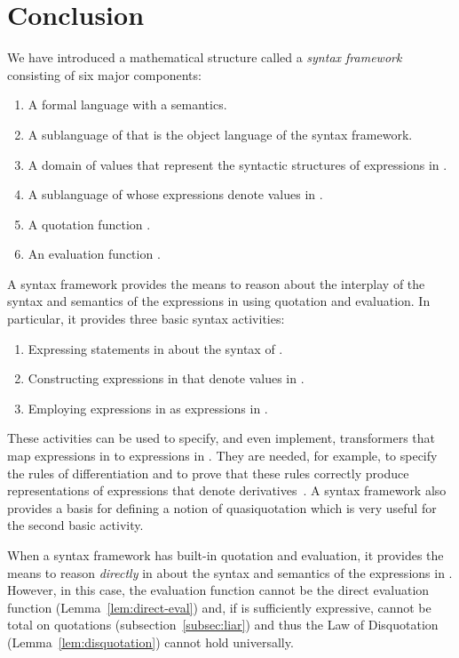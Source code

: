 \documentclass[11pt,fleqn]{article}
\newcommand{\be}{\begin{enumerate}}
\newcommand{\ee}{\end{enumerate}}
\begin{document}
\newpage

\section{Conclusion} \label{sec:conclusion}

We have introduced a mathematical structure called a \emph{syntax
  framework} consisting of six major components:

\be

  \item A formal language  with a semantics.

  \item A sublanguage  of  that is the object language
    of the syntax framework.

  \item A domain  of values that represent the syntactic
    structures of expressions in .

  \item A sublanguage  of  whose expressions denote
    values in .

  \item A quotation function .

  \item An evaluation function .

\ee

A syntax framework provides the means to reason about the interplay of
the syntax and semantics of the expressions in  using
quotation and evaluation.  In particular, it provides three basic
syntax activities:

\be

  \item Expressing statements in  about the syntax of .

  \item Constructing expressions in  that denote values
    in .

  \item Employing expressions in  as expressions in
    .

\ee
These activities can be used to specify, and even implement,
transformers that map expressions in  to expressions in
.  They are needed, for example, to specify the rules of
differentiation and to prove that these rules correctly produce
representations of expressions that denote
derivatives~\cite{Farmer13}.  A syntax framework also provides a basis
for defining a notion of quasiquotation which is very useful for the
second basic activity.

When a syntax framework has built-in quotation and evaluation, it
provides the means to reason \emph{directly} in  about the syntax
and semantics of the expressions in .  However, in this
case, the evaluation function  cannot be the direct evaluation
function (Lemma~\ref{lem:direct-eval}) and, if  is sufficiently
expressive,  cannot be total on quotations
(subsection~\ref{subsec:liar}) and thus the Law of Disquotation
(Lemma~\ref{lem:disquotation}) cannot hold universally. 
\end{document}
